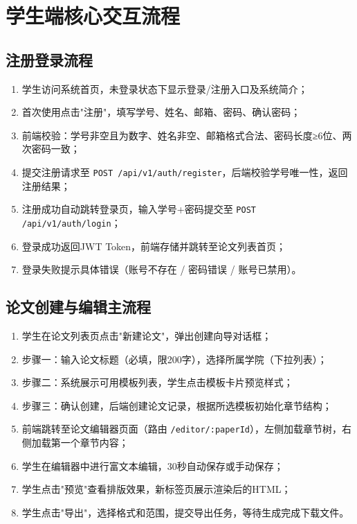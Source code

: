 \documentclass{../../softeng}
\begin{document}

\section{学生端核心交互流程}

\subsection{注册登录流程}

\begin{enumerate}
    \item 学生访问系统首页，未登录状态下显示登录/注册入口及系统简介；
    \item 首次使用点击"注册"，填写学号、姓名、邮箱、密码、确认密码；
    \item 前端校验：学号非空且为数字、姓名非空、邮箱格式合法、密码长度≥6位、两次密码一致；
    \item 提交注册请求至 \texttt{POST /api/v1/auth/register}，后端校验学号唯一性，返回注册结果；
    \item 注册成功自动跳转登录页，输入学号+密码提交至 \texttt{POST /api/v1/auth/login}；
    \item 登录成功返回JWT Token，前端存储并跳转至论文列表首页；
    \item 登录失败提示具体错误（账号不存在 / 密码错误 / 账号已禁用）。
\end{enumerate}

\subsection{论文创建与编辑主流程}

\begin{enumerate}
    \item 学生在论文列表页点击"新建论文"，弹出创建向导对话框；
    \item 步骤一：输入论文标题（必填，限200字），选择所属学院（下拉列表）；
    \item 步骤二：系统展示可用模板列表，学生点击模板卡片预览样式；
    \item 步骤三：确认创建，后端创建论文记录，根据所选模板初始化章节结构；
    \item 前端跳转至论文编辑器页面（路由 \texttt{/editor/:paperId}），左侧加载章节树，右侧加载第一个章节内容；
    \item 学生在编辑器中进行富文本编辑，30秒自动保存或手动保存；
    \item 学生点击"预览"查看排版效果，新标签页展示渲染后的HTML；
    \item 学生点击"导出"，选择格式和范围，提交导出任务，等待生成完成下载文件。
\end{enumerate}
\end{document}

